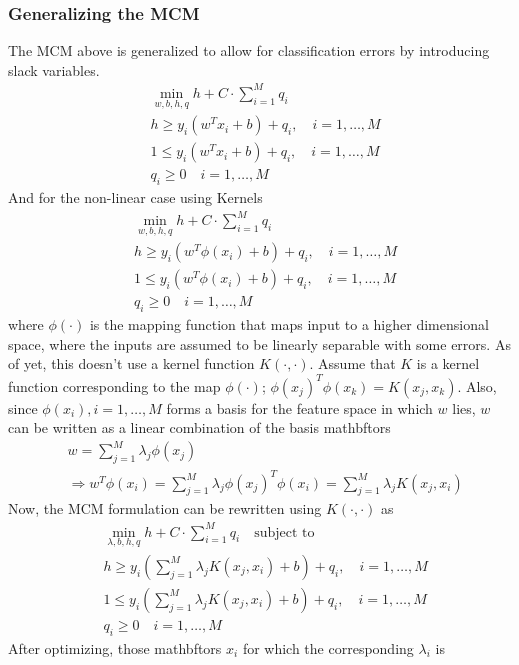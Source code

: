 \documentclass[11pt]{article}
\begin{document}
\subsubsection{Generalizing the MCM}
The MCM above is generalized to allow for classification errors by
introducing slack variables.
\begin{align*}
    &\min_{w,b,h,q}h+C\cdot\sum_{i=1}^Mq_i\\
    &h\ge y_i(w^Tx_i+b)+q_i,\quad i=1,\dotsc,M\\
    &1\le y_i(w^Tx_i+b)+q_i,\quad i=1,\dotsc,M\\
    &q_i\ge 0\quad i=1,\dotsc,M
\end{align*}
And for the non-linear case using Kernels
\begin{align}
    &\min_{w,b,h,q}h+C\cdot\sum_{i=1}^Mq_i\\
    &h\ge y_i(w^T\phi(x_i)+b)+q_i,\quad i=1,\dotsc,M\\
    &1\le y_i(w^T\phi(x_i)+b)+q_i,\quad i=1,\dotsc,M\\
    &q_i\ge 0\quad i=1,\dotsc,M
\end{align}
where $\phi(\cdot)$ is the mapping function that maps input to a higher
dimensional space, where the inputs are assumed to be linearly separable with
some errors. As of yet, this doesn't use a kernel function $K(\cdot,\cdot)$. Assume that $K$
is a kernel function corresponding to the map $\phi(\cdot)$;
$\phi(x_j)^T\phi(x_k)=K(x_j,x_k)$. Also, since $\phi(x_i), i=1,\dotsc,M$ forms a
basis for the feature space in which $w$ lies, $w$ can be written as a linear
combination of the basis mathbftors
\begin{align*}
    &w=\sum_{j=1}^M\lambda_j\phi(x_j)\\
    &\Rightarrow
    w^T\phi(x_i)=\sum_{j=1}^M\lambda_j\phi(x_j)^T\phi(x_i)=\sum_{j=1}^M\lambda_jK(x_j,x_i)
\end{align*}
Now, the MCM formulation can be rewritten using $K(\cdot,\cdot)$ as
\begin{align}
    &\label{eq:mcmstart}\min_{\lambda,b,h,q}h+C\cdot\sum_{i=1}^Mq_i\quad\text{subject to}\\
    &\label{eq:upbound}h\ge y_i\left(\sum_{j=1}^M\lambda_jK(x_j,x_i)+b\right)+q_i,\quad i=1,\dotsc,M\\
    &1\le y_i\left(\sum_{j=1}^M\lambda_jK(x_j,x_i)+b\right)+q_i,\quad i=1,\dotsc,M\\
    &\label{eq:mcmend}q_i\ge 0\quad i=1,\dotsc,M
\end{align}
After optimizing, those mathbftors $x_i$ for which the corresponding $\lambda_i$ is
\end{document}
